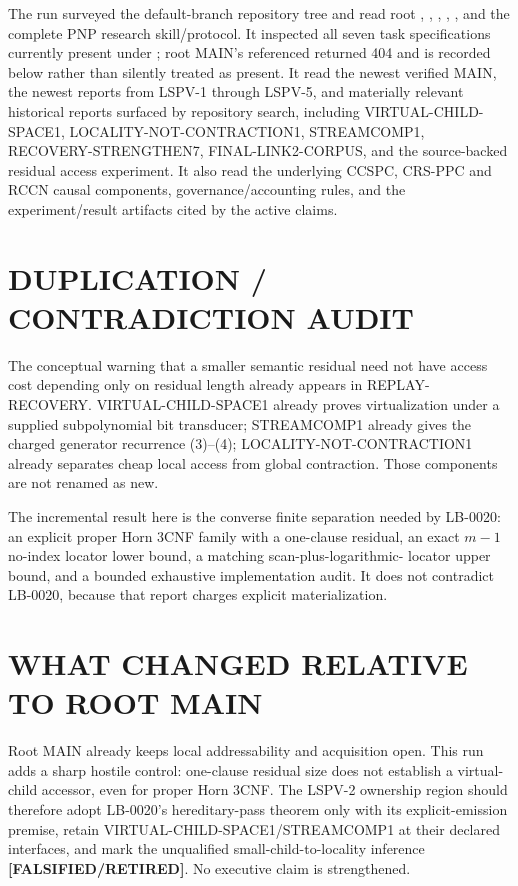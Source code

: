 \documentclass[11pt]{article}
\newcommand{\status}[1]{\textbf{[#1]}}
\begin{document}
The run surveyed the default-branch repository tree and read root
, , , ,
, and the complete PNP research skill/protocol.  It inspected
all seven task specifications currently present under ; root
MAIN's referenced  returned 404 and is
recorded below rather than silently treated as present.  It read the newest
verified MAIN, the newest reports from LSPV-1 through LSPV-5, and materially
relevant historical reports surfaced by repository search, including
VIRTUAL-CHILD-SPACE1, LOCALITY-NOT-CONTRACTION1, STREAMCOMP1,
RECOVERY-STRENGTHEN7, FINAL-LINK2-CORPUS, and the source-backed residual
access experiment.  It also read the underlying CCSPC, CRS-PPC and RCCN
causal components, governance/accounting rules, and the experiment/result
artifacts cited by the active claims.

\section{DUPLICATION / CONTRADICTION AUDIT}

The conceptual warning that a smaller semantic residual need not have access
cost depending only on residual length already appears in REPLAY-RECOVERY.
VIRTUAL-CHILD-SPACE1 already proves virtualization under a supplied
subpolynomial bit transducer; STREAMCOMP1 already gives the charged generator
recurrence (3)--(4); LOCALITY-NOT-CONTRACTION1 already separates cheap local
access from global contraction.  Those components are not renamed as new.

The incremental result here is the converse finite separation needed by
LB-0020: an explicit proper Horn 3CNF family with a one-clause residual, an
exact $m-1$ no-index locator lower bound, a matching scan-plus-logarithmic-
locator upper bound, and a bounded exhaustive implementation audit.  It does
not contradict LB-0020, because that report charges explicit materialization.

\section{WHAT CHANGED RELATIVE TO ROOT MAIN}

Root MAIN already keeps local addressability and acquisition open.  This run
adds a sharp hostile control: one-clause residual size does not establish a
virtual-child accessor, even for proper Horn 3CNF.  The LSPV-2 ownership
region should therefore adopt LB-0020's hereditary-pass theorem only with its
explicit-emission premise, retain VIRTUAL-CHILD-SPACE1/STREAMCOMP1 at their
declared interfaces, and mark the unqualified small-child-to-locality
inference \status{FALSIFIED/RETIRED}.  No executive claim is strengthened.
\end{document}
